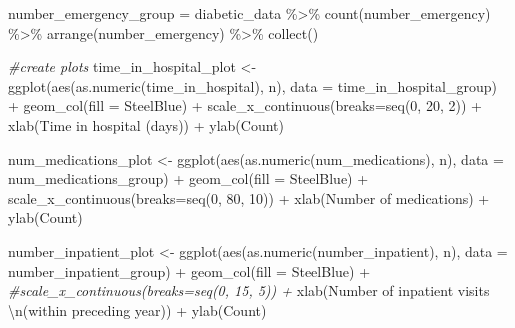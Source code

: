 \documentclass[
]{article}
\newenvironment{Shaded}{\begin{snugshade}}{\end{snugshade}}
\newcommand{\AttributeTok}[1]{\textcolor[rgb]{0.77,0.63,0.00}{#1}}
\newcommand{\CommentTok}[1]{\textcolor[rgb]{0.56,0.35,0.01}{\textit{#1}}}
\newcommand{\DecValTok}[1]{\textcolor[rgb]{0.00,0.00,0.81}{#1}}
\newcommand{\FunctionTok}[1]{\textcolor[rgb]{0.00,0.00,0.00}{#1}}
\newcommand{\NormalTok}[1]{#1}
\newcommand{\OtherTok}[1]{\textcolor[rgb]{0.56,0.35,0.01}{#1}}
\newcommand{\SpecialCharTok}[1]{\textcolor[rgb]{0.00,0.00,0.00}{#1}}
\newcommand{\StringTok}[1]{\textcolor[rgb]{0.31,0.60,0.02}{#1}}
\begin{document}
\begin{Shaded}
\begin{Highlighting}[]
\NormalTok{number\_emergency\_group }\OtherTok{=}\NormalTok{ diabetic\_data }\SpecialCharTok{\%\textgreater{}\%} 
  \FunctionTok{count}\NormalTok{(number\_emergency) }\SpecialCharTok{\%\textgreater{}\%}
  \FunctionTok{arrange}\NormalTok{(number\_emergency) }\SpecialCharTok{\%\textgreater{}\%}
  \FunctionTok{collect}\NormalTok{()}

\CommentTok{\#create plots}
\NormalTok{time\_in\_hospital\_plot }\OtherTok{\textless{}{-}} 
  \FunctionTok{ggplot}\NormalTok{(}\FunctionTok{aes}\NormalTok{(}\FunctionTok{as.numeric}\NormalTok{(time\_in\_hospital), n), }\AttributeTok{data =}\NormalTok{ time\_in\_hospital\_group) }\SpecialCharTok{+}
  \FunctionTok{geom\_col}\NormalTok{(}\AttributeTok{fill =} \StringTok{\textquotesingle{}SteelBlue\textquotesingle{}}\NormalTok{) }\SpecialCharTok{+}
  \FunctionTok{scale\_x\_continuous}\NormalTok{(}\AttributeTok{breaks=}\FunctionTok{seq}\NormalTok{(}\DecValTok{0}\NormalTok{, }\DecValTok{20}\NormalTok{, }\DecValTok{2}\NormalTok{))  }\SpecialCharTok{+}
  \FunctionTok{xlab}\NormalTok{(}\StringTok{\textquotesingle{}Time in hospital (days)\textquotesingle{}}\NormalTok{) }\SpecialCharTok{+}
  \FunctionTok{ylab}\NormalTok{(}\StringTok{\textquotesingle{}Count\textquotesingle{}}\NormalTok{)}

\NormalTok{num\_medications\_plot }\OtherTok{\textless{}{-}} 
  \FunctionTok{ggplot}\NormalTok{(}\FunctionTok{aes}\NormalTok{(}\FunctionTok{as.numeric}\NormalTok{(num\_medications), n), }\AttributeTok{data =}\NormalTok{ num\_medications\_group) }\SpecialCharTok{+}
  \FunctionTok{geom\_col}\NormalTok{(}\AttributeTok{fill =} \StringTok{\textquotesingle{}SteelBlue\textquotesingle{}}\NormalTok{) }\SpecialCharTok{+}
  \FunctionTok{scale\_x\_continuous}\NormalTok{(}\AttributeTok{breaks=}\FunctionTok{seq}\NormalTok{(}\DecValTok{0}\NormalTok{, }\DecValTok{80}\NormalTok{, }\DecValTok{10}\NormalTok{))  }\SpecialCharTok{+}
  \FunctionTok{xlab}\NormalTok{(}\StringTok{\textquotesingle{}Number of medications\textquotesingle{}}\NormalTok{) }\SpecialCharTok{+}
  \FunctionTok{ylab}\NormalTok{(}\StringTok{\textquotesingle{}Count\textquotesingle{}}\NormalTok{)}

\NormalTok{number\_inpatient\_plot }\OtherTok{\textless{}{-}} 
  \FunctionTok{ggplot}\NormalTok{(}\FunctionTok{aes}\NormalTok{(}\FunctionTok{as.numeric}\NormalTok{(number\_inpatient), n), }\AttributeTok{data =}\NormalTok{ number\_inpatient\_group) }\SpecialCharTok{+}
  \FunctionTok{geom\_col}\NormalTok{(}\AttributeTok{fill =} \StringTok{\textquotesingle{}SteelBlue\textquotesingle{}}\NormalTok{) }\SpecialCharTok{+}
  \CommentTok{\#scale\_x\_continuous(breaks=seq(0, 15, 5))  +}
  \FunctionTok{xlab}\NormalTok{(}\StringTok{\textquotesingle{}Number of inpatient visits }\SpecialCharTok{\textbackslash{}n}\StringTok{(within preceding year)\textquotesingle{}}\NormalTok{) }\SpecialCharTok{+}
  \FunctionTok{ylab}\NormalTok{(}\StringTok{\textquotesingle{}Count\textquotesingle{}}\NormalTok{)}


\end{Highlighting}
\end{Shaded}
\end{document}
